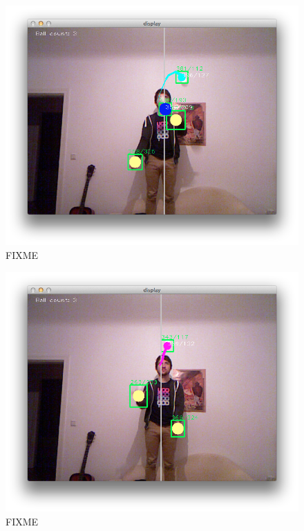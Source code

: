 \documentclass[12pt,a4paper,ngerman]{scrartcl}
\begin{document}
\begin{figure}[H]
    \centering
    \includegraphics[scale=0.5]{img/ballcount-1.png}
    \vspace{-0.5cm}
    \caption{FIXME}
    \label{ballcount-1}
\end{figure}

\begin{figure}[H]
    \centering
    \includegraphics[scale=0.5]{img/ballcount-2.png}
    \vspace{-0.5cm}
    \caption{FIXME}
    \label{ballcount-2}
\end{figure}
\end{document}
